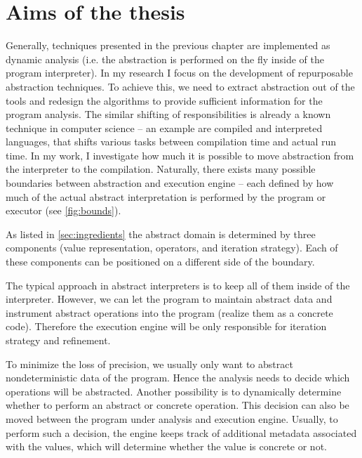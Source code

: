 \chapter{Aims of the thesis}
\label{ch:aim}



Generally, techniques presented in the previous chapter are implemented as
dynamic analysis (i.e. the abstraction is performed on the fly inside of the
program interpreter).  In my research I focus on the development of
repurposable abstraction techniques. To achieve this, we need to extract
abstraction out of the tools and redesign the algorithms to provide sufficient
information for the program analysis. The similar shifting of responsibilities
is already a known technique in computer science -- an example are compiled and
interpreted languages, that shifts various tasks between compilation time and
actual run time. In my work, I investigate how much it is possible to move
abstraction from the interpreter to the compilation. Naturally, there exists
many possible boundaries between abstraction and execution engine -- each
defined by how much of the actual abstract interpretation is performed by the
program or executor (see \autoref{fig:bounds}).


As listed in \autoref{sec:ingredients} the abstract domain is determined by
three components (value representation, operators, and iteration strategy).
Each of these components can be positioned on a different side of the boundary.

The typical approach in abstract interpreters is to keep all of them inside of
the interpreter. However, we can let the program to maintain abstract data and
instrument abstract operations into the program (realize them as a concrete
code). Therefore the execution engine will be only responsible for iteration
strategy and refinement.

To minimize the loss of precision, we usually only want to abstract
nondeterministic data of the program. Hence the analysis needs to decide which
operations will be abstracted. Another possibility is to dynamically determine
whether to perform an abstract or concrete operation. This decision can also be
moved between the program under analysis and execution engine. Usually, to
perform such a decision, the engine keeps track of additional metadata
associated with the values, which will determine whether the value is concrete
or not.

